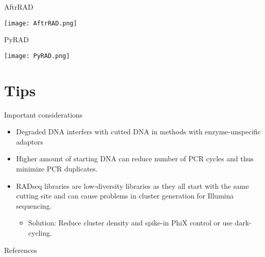 \documentclass[presentation]{beamer}
\begin{document}
\begin{frame}[label=sec-4-1-9]{AftrRAD}
\begin{center}

\texttt{[image: AftrRAD.png]}

\end{center}
\end{frame}

\begin{frame}[label=sec-4-1-10]{PyRAD}
\begin{center}

\texttt{[image: PyRAD.png]}

\end{center}
\end{frame}
\section{Tips}
\label{sec-5}
\begin{frame}[label=sec-5-0-1]{Important considerations}
\begin{itemize}
\item Degraded DNA interfers with cutted DNA in methods with enzyme-unspecific adaptors
\item Higher amount of starting DNA can reduce number of PCR cycles and
thus minimize PCR duplicates.
\item RADseq libraries are low-diversity libraries as they all start with
the same cutting site and can cause problems in cluster generation
for Illumina sequencing.
\begin{itemize}
\item Solution: Reduce cluster density and spike-in PhiX control or use dark-cycling.
\end{itemize}
\end{itemize}
\end{frame}
\begin{frame}[allowframebreaks]{References}
\raggedright
\printbibliography[sorting=nty,heading=bibnumbered]
\end{frame}
\end{document}
